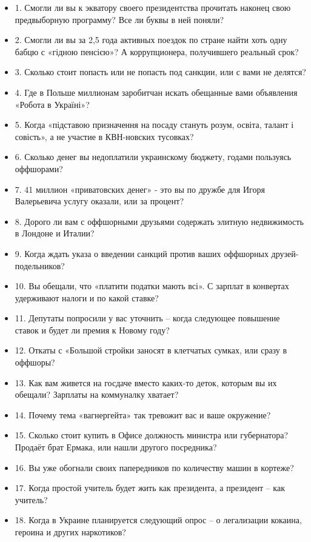 \begin{itemize}
  \item 1. Смогли ли вы к экватору своего президентства прочитать наконец свою предвыборную программу? Все ли буквы в ней поняли?
  \item 2. Смогли ли вы за 2,5 года активных поездок по стране найти хоть одну бабцю с «гідною пенсією»? А коррупционера, получившего реальный срок?
  \item 3. Сколько стоит попасть или не попасть под санкции, или с вами не делятся?
  \item 4. Где в Польше миллионам заробитчан искать обещанные вами объявления «Робота в Україні»?
  \item 5. Когда «підставою призначення на посаду стануть розум, освіта, талант і совість», а не участие в КВН-новских тусовках?
  \item 6. Сколько денег вы недоплатили украинскому бюджету, годами пользуясь оффшорами?
  \item 7. 41 миллион «приватовских денег» - это вы по дружбе для Игоря Валерьевича услугу оказали, или за процент? 
  \item 8. Дорого ли вам с оффшорными друзьями содержать элитную недвижимость в Лондоне и Италии?
  \item 9. Когда ждать указа о введении санкций против ваших оффшорных друзей-подельников?
  \item 10. Вы обещали, что «платити податки мають всі». С зарплат в конвертах удерживают налоги и по какой ставке?
  \item 11. Депутаты попросили у вас уточнить – когда следующее повышение ставок и будет ли премия к Новому году?
  \item 12. Откаты с «Большой стройки заносят в клетчатых сумках, или сразу в оффшоры?
  \item 13. Как вам живется на госдаче вместо каких-то деток, которым вы их обещали? Зарплаты на коммуналку хватает?
  \item 14. Почему тема «вагнергейта» так тревожит вас и ваше окружение?
  \item 15. Сколько стоит купить в Офисе должность министра или губернатора? Продаёт брат Ермака, или нашли другого посредника?
  \item 16. Вы уже обогнали своих папередников по количеству машин в кортеже?
  \item 17. Когда простой учитель будет жить как президента, а президент – как учитель?
  \item 18. Когда в Украине планируется следующий опрос – о легализации кокаина, героина и других наркотиков?

\end{itemize}
